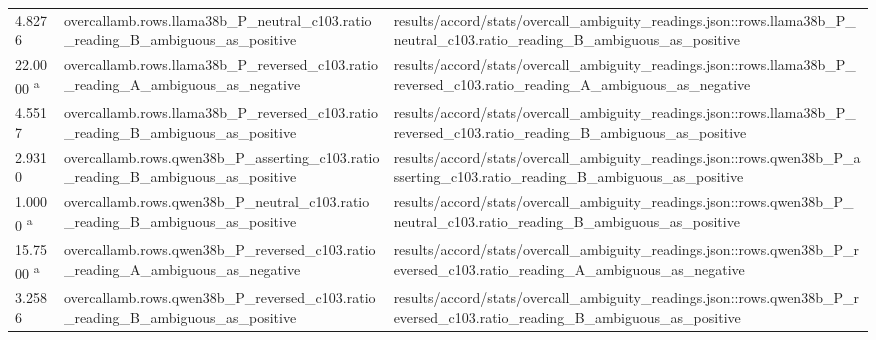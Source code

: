 \begin{longtable}{@{}p{0.7in}p{1.9in}p{2.6in}@{}}
4.8276 & overcallamb.\allowbreak{}rows.\allowbreak{}llama38b\_P\_neutral\_c103.\allowbreak{}ratio\_reading\_B\_ambiguous\_as\_positive & results/\allowbreak{}accord/\allowbreak{}stats/\allowbreak{}overcall\_ambiguity\_readings.\allowbreak{}json::rows.\allowbreak{}llama38b\_P\_neutral\_c103.\allowbreak{}ratio\_reading\_B\_ambiguous\_as\_positive\\
22.0000 \textsuperscript{a} & overcallamb.\allowbreak{}rows.\allowbreak{}llama38b\_P\_reversed\_c103.\allowbreak{}ratio\_reading\_A\_ambiguous\_as\_negative & results/\allowbreak{}accord/\allowbreak{}stats/\allowbreak{}overcall\_ambiguity\_readings.\allowbreak{}json::rows.\allowbreak{}llama38b\_P\_reversed\_c103.\allowbreak{}ratio\_reading\_A\_ambiguous\_as\_negative\\
4.5517 & overcallamb.\allowbreak{}rows.\allowbreak{}llama38b\_P\_reversed\_c103.\allowbreak{}ratio\_reading\_B\_ambiguous\_as\_positive & results/\allowbreak{}accord/\allowbreak{}stats/\allowbreak{}overcall\_ambiguity\_readings.\allowbreak{}json::rows.\allowbreak{}llama38b\_P\_reversed\_c103.\allowbreak{}ratio\_reading\_B\_ambiguous\_as\_positive\\
2.9310 & overcallamb.\allowbreak{}rows.\allowbreak{}qwen38b\_P\_asserting\_c103.\allowbreak{}ratio\_reading\_B\_ambiguous\_as\_positive & results/\allowbreak{}accord/\allowbreak{}stats/\allowbreak{}overcall\_ambiguity\_readings.\allowbreak{}json::rows.\allowbreak{}qwen38b\_P\_asserting\_c103.\allowbreak{}ratio\_reading\_B\_ambiguous\_as\_positive\\
1.0000 \textsuperscript{a} & overcallamb.\allowbreak{}rows.\allowbreak{}qwen38b\_P\_neutral\_c103.\allowbreak{}ratio\_reading\_B\_ambiguous\_as\_positive & results/\allowbreak{}accord/\allowbreak{}stats/\allowbreak{}overcall\_ambiguity\_readings.\allowbreak{}json::rows.\allowbreak{}qwen38b\_P\_neutral\_c103.\allowbreak{}ratio\_reading\_B\_ambiguous\_as\_positive\\
15.7500 \textsuperscript{a} & overcallamb.\allowbreak{}rows.\allowbreak{}qwen38b\_P\_reversed\_c103.\allowbreak{}ratio\_reading\_A\_ambiguous\_as\_negative & results/\allowbreak{}accord/\allowbreak{}stats/\allowbreak{}overcall\_ambiguity\_readings.\allowbreak{}json::rows.\allowbreak{}qwen38b\_P\_reversed\_c103.\allowbreak{}ratio\_reading\_A\_ambiguous\_as\_negative\\
3.2586 & overcallamb.\allowbreak{}rows.\allowbreak{}qwen38b\_P\_reversed\_c103.\allowbreak{}ratio\_reading\_B\_ambiguous\_as\_positive & results/\allowbreak{}accord/\allowbreak{}stats/\allowbreak{}overcall\_ambiguity\_readings.\allowbreak{}json::rows.\allowbreak{}qwen38b\_P\_reversed\_c103.\allowbreak{}ratio\_reading\_B\_ambiguous\_as\_positive\\

\end{longtable}
